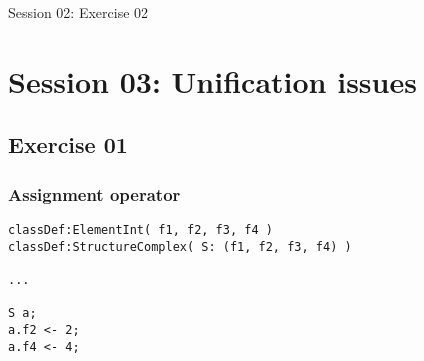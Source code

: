 \documentclass[11pt]{beamer}
\begin{document}
\begin{frame}[fragile]
\Huge
\begin{center}
Session 02: Exercise 02
\end{center}
\end{frame}

\section{Session 03: Unification issues}

\subsection{Exercise 01}

\begin{frame}[fragile]
\frametitle{Assignment operator}
\vspace{-20pt}
\scriptsize
\begin{lstlisting}[language=lekta]
classDef:ElementInt( f1, f2, f3, f4 )
classDef:StructureComplex( S: (f1, f2, f3, f4) )

...

S a;
a.f2 <- 2;
a.f4 <- 4;


\end{lstlisting}
\end{frame}
\end{document}
